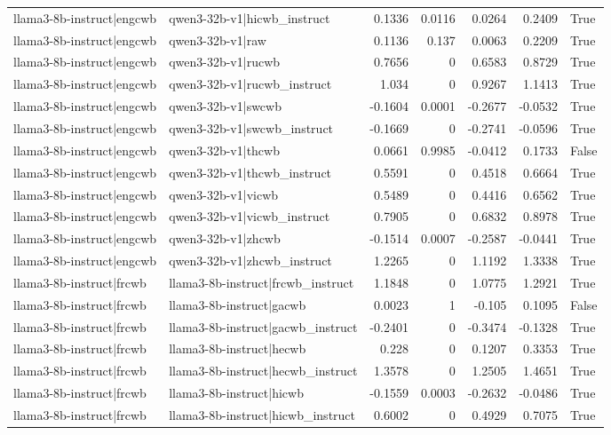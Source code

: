 \begin{table}
\begin{tabular}{l l r r r r l}
llama3-8b-instruct|engcwb & qwen3-32b-v1|hicwb_instruct & 0.1336 & 0.0116 & 0.0264 & 0.2409 & True \\
llama3-8b-instruct|engcwb & qwen3-32b-v1|raw & 0.1136 & 0.137 & 0.0063 & 0.2209 & True \\
llama3-8b-instruct|engcwb & qwen3-32b-v1|rucwb & 0.7656 & 0 & 0.6583 & 0.8729 & True \\
llama3-8b-instruct|engcwb & qwen3-32b-v1|rucwb_instruct & 1.034 & 0 & 0.9267 & 1.1413 & True \\
llama3-8b-instruct|engcwb & qwen3-32b-v1|swcwb & -0.1604 & 0.0001 & -0.2677 & -0.0532 & True \\
llama3-8b-instruct|engcwb & qwen3-32b-v1|swcwb_instruct & -0.1669 & 0 & -0.2741 & -0.0596 & True \\
llama3-8b-instruct|engcwb & qwen3-32b-v1|thcwb & 0.0661 & 0.9985 & -0.0412 & 0.1733 & False \\
llama3-8b-instruct|engcwb & qwen3-32b-v1|thcwb_instruct & 0.5591 & 0 & 0.4518 & 0.6664 & True \\
llama3-8b-instruct|engcwb & qwen3-32b-v1|vicwb & 0.5489 & 0 & 0.4416 & 0.6562 & True \\
llama3-8b-instruct|engcwb & qwen3-32b-v1|vicwb_instruct & 0.7905 & 0 & 0.6832 & 0.8978 & True \\
llama3-8b-instruct|engcwb & qwen3-32b-v1|zhcwb & -0.1514 & 0.0007 & -0.2587 & -0.0441 & True \\
llama3-8b-instruct|engcwb & qwen3-32b-v1|zhcwb_instruct & 1.2265 & 0 & 1.1192 & 1.3338 & True \\
llama3-8b-instruct|frcwb & llama3-8b-instruct|frcwb_instruct & 1.1848 & 0 & 1.0775 & 1.2921 & True \\
llama3-8b-instruct|frcwb & llama3-8b-instruct|gacwb & 0.0023 & 1 & -0.105 & 0.1095 & False \\
llama3-8b-instruct|frcwb & llama3-8b-instruct|gacwb_instruct & -0.2401 & 0 & -0.3474 & -0.1328 & True \\
llama3-8b-instruct|frcwb & llama3-8b-instruct|hecwb & 0.228 & 0 & 0.1207 & 0.3353 & True \\
llama3-8b-instruct|frcwb & llama3-8b-instruct|hecwb_instruct & 1.3578 & 0 & 1.2505 & 1.4651 & True \\
llama3-8b-instruct|frcwb & llama3-8b-instruct|hicwb & -0.1559 & 0.0003 & -0.2632 & -0.0486 & True \\
llama3-8b-instruct|frcwb & llama3-8b-instruct|hicwb_instruct & 0.6002 & 0 & 0.4929 & 0.7075 & True \\

\end{tabular}
\end{table}
